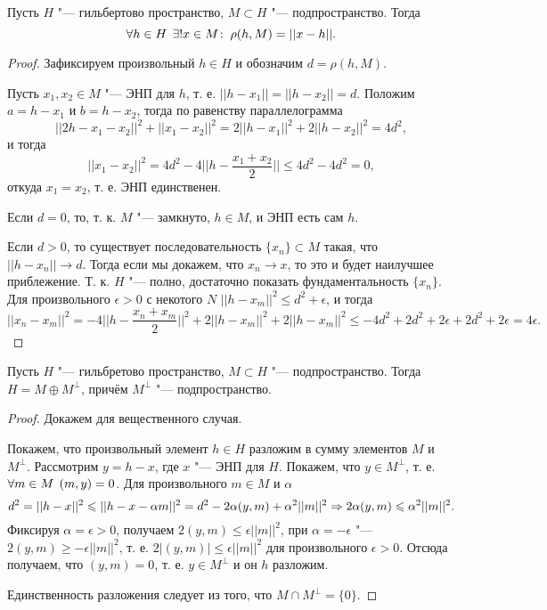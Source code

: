 \documentclass[main]{subfiles}
\begin{document}
\begin{lemma}
  Пусть \( H \) "--- гильбертово пространство, \( M \subset H \) "---
  подпространство. Тогда
  \[ \forall {h \in H} \; \, \exists! x \in M \colon \: \rho(h, M) = ||x - h||. \]
\end{lemma}
\begin{proof}
  Зафиксируем произвольный \( h \in H \) и обозначим \( d = \rho(h, M) \).

  Пусть \( x_1, x_2 \in M \) "--- ЭНП для \( h \), т. е.
  \( ||h - x_1|| = ||h - x_2|| = d \).
  Положим \( a = h - x_1 \) и \( b = h - x_2 \),
  тогда по равенству параллелограмма
  \[ ||2h - x_1 - x_2||^2 + ||x_1 - x_2||^2 =
  2||h - x_1||^2 + 2 ||h - x_2||^2 = 4 d^2, \]
  и тогда
  \[ ||x_1 - x_2||^2 = 4d^2 - 4 ||h - \frac{x_1 + x_2}{2}||
  \le 4d^2 - 4d^2 = 0, \]
  откуда \( x_1 = x_2 \), т. е. ЭНП единственен.

  Если \( d = 0 \), то, т. к. \( M \) "--- замкнуто,
  \( h \in M \), и ЭНП есть сам \( h \).

  Если \( d > 0 \), то существует последовательность
  \( \{ x_n \} \subset M \) такая, что
  \( ||h - x_n|| \to d \). Тогда если мы докажем,
  что \( x_n \to x \), то это и будет наилучшее приблежение.
  Т. к. \( H \) "--- полно, достаточно показать фундаментальность
  \( \{ x_n \} \). Для произвольного \( \epsilon > 0 \)
  с некотого \( N \) \( ||h - x_m||^2 \le d^2 + \epsilon \),
  и тогда
  \[ ||x_n - x_m||^2 = -4 ||h - \frac{x_n + x_m}{2}||^2
    + 2 ||h - x_m||^2 + 2||h - x_m||^2 \le
    -4 d^2 + 2d^2 + 2\epsilon + 2d^2 + 2\epsilon =
    4 \epsilon. \]
\end{proof}


\begin{theorem}[о проекции]
  Пусть \( H \) "--- гильбретово пространство, \( M \subset H \) "---
  подпространство. Тогда \( H = M \oplus M^\perp \),
  причём \( M^\perp \) "--- подпространство.
\end{theorem}
\begin{proof}
  Докажем для вещественного случая.

  Покажем, что произвольный элемент \( h \in H \) разложим
  в сумму элементов \( M \) и \( M^\perp \).
  Рассмотрим \( y = h - x \), где \( x \) "--- ЭНП для \( H \).
  Покажем, что \( y \in M^\perp \), т. е. \( \forall {m \in M} \; \, (m, y) = 0 \).
  Для произвольного \( m \in M \) и \( \alpha \)
  \[ d^2 = ||h - x||^2 \leqslant ||h - x - \alpha m||^2 =
  d^2 - 2 \alpha (y, m) + \alpha^2 ||m||^2 \Rightarrow
  2 \alpha (y, m) \leqslant \alpha^2 ||m||^2. \]
  Фиксируя \( \alpha = \epsilon > 0 \), получаем \( 2 (y, m) \le \epsilon ||m||^2 \),
  при \( \alpha = -\epsilon \) "--- \( 2 (y, m) \ge -\epsilon ||m||^2 \),
  т. е. \( 2 |(y, m)| \le \epsilon ||m||^2 \) для произвольного \( \epsilon > 0 \).
  Отсюда получаем, что \( (y, m) = 0 \), т. е. \( y \in M^\perp \)
  и он \( h \) разложим.

  Единственность разложения следует из того, что \( M \cap M^\perp = \{ 0 \} \).
\end{proof}
\end{document}
